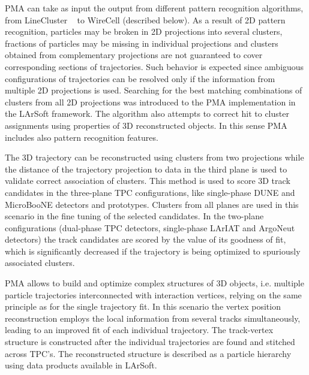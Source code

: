 PMA can take as input the output from different pattern recognition algorithms, from
LineCluster ~\cite{linecluster} to WireCell (described below). As a result of 2D pattern
recognition, particles may be broken in 2D projections into several clusters, fractions
of particles may be missing in individual projections and clusters obtained from complementary
projections are not guaranteed to cover corresponding sections of trajectories. Such behavior
is expected since ambiguous configurations of trajectories can be resolved only if the information
from multiple 2D projections is used. Searching for the best matching combinations of clusters from
all 2D projections was introduced to the PMA implementation in the LArSoft framework. The algorithm
also attempts to correct hit to cluster assignments using properties of 3D reconstructed objects.
In this sense PMA includes also pattern recognition features.

The 3D trajectory can be reconstructed using clusters from two projections while the distance of
the trajectory projection to data in the third plane is used to validate correct association of clusters.
This method is used to score 3D track candidates in the three-plane TPC configurations, like single-phase
DUNE and MicroBooNE detectors and prototypes. Clusters from all planes are used in this scenario in the
fine tuning of the selected candidates. In the two-plane configurations (dual-phase TPC detectors, single-phase
LArIAT and ArgoNeut detectors) the track candidates are scored by the value of its goodness of fit, which is
significantly decreased if the trajectory is being optimized to spuriously associated clusters.

PMA allows to build and optimize complex structures of 3D objects, i.e. multiple particle trajectories
interconnected with interaction vertices, relying on the same principle as for the single trajectory fit.
In this scenario the vertex position reconstruction employs the local information from several tracks
simultaneously, leading to an improved fit of each individual trajectory. The track-vertex structure
is constructed after the individual trajectories are found and stitched across TPC's.
 The reconstructed
structure is described as a particle hierarchy using data products available in LArSoft.

